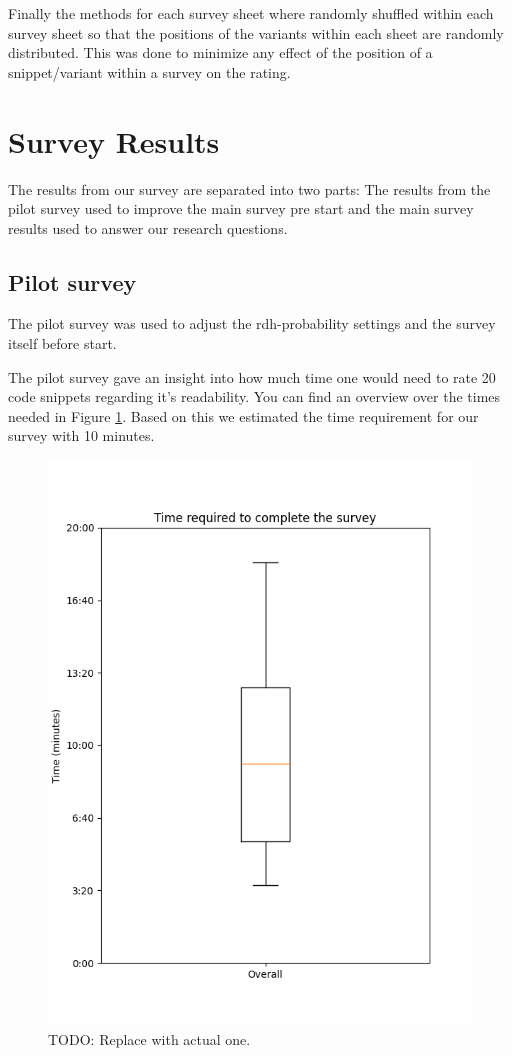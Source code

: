 \documentclass[%
class=scrreprt,
chapterprefix=false,%
open=right,%
twoside=false,%
paper=a4,%
logofile={Logo\_zentral\_farbig\_EN.png},%
thesistype=master,%
UKenglish,%
]{se2thesis}
\begin{document}
	Finally the methods for each survey sheet where randomly shuffled within each survey sheet so that the positions of the variants within each sheet are randomly distributed. This was done to minimize any effect of the position of a snippet/variant within a survey on the rating.	
	
\section{Survey Results} \label{Survey Results}
	The results from our survey are separated into two parts: The results from the pilot survey used to improve the main survey pre start and the main survey results used to answer our research questions.
	
	\subsection{Pilot survey} \label{Pilot Survey}
	The pilot survey was used to adjust the rdh-probability settings and the survey itself before start.
	
	The pilot survey gave an insight into how much time one would need to rate 20 code snippets regarding it's readability. You can find an overview over the times needed in Figure \ref{fig:pilot_survey_time_box.png}. Based on this we estimated the time requirement for our survey with 10 minutes.
	
	\begin{figure}[t]
		\centering
		\includegraphics[width=\textwidth]{img/survey_time_box.png}
		\caption{TODO: Replace with actual one.}
		\label{fig:pilot_survey_time_box.png}
	\end{figure}
	
\end{document}

